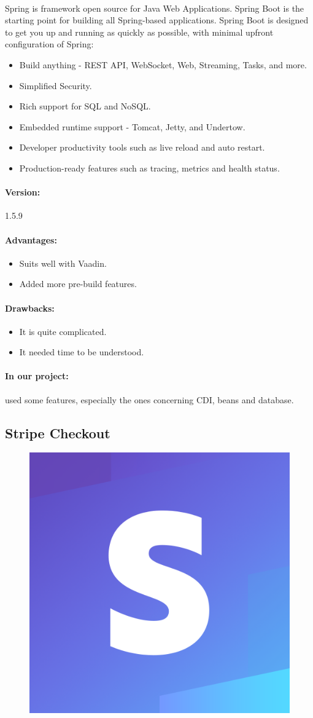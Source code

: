 \documentclass{article}
\begin{document}
		\paragraph{}Spring is framework open source for Java Web Applications. Spring Boot is the starting point for building all Spring-based applications. Spring Boot is designed to get you up and running as quickly as possible, with minimal upfront configuration of Spring: 
		\begin{itemize}
			\item{}Build anything - REST API, WebSocket, Web, Streaming, Tasks, and more.
			\item{}Simplified Security.
			\item{}Rich support for SQL and NoSQL.
			\item{}Embedded runtime support - Tomcat, Jetty, and Undertow.
			\item{}Developer productivity tools such as live reload and auto restart.
			\item{}Production-ready features such as tracing, metrics and health status.
		\end{itemize}
		\paragraph{Version:}1.5.9
		\paragraph{Advantages:}
		\begin{itemize}
			\item{}Suits well with Vaadin.
			\item{}Added more pre-build features.
		\end{itemize}
		\paragraph{Drawbacks:}
		\begin{itemize}
			\item{}It is quite complicated.
			\item{}It needed time to be understood.
		\end{itemize}
		\paragraph{In our project:}used some features, especially the ones concerning CDI, beans and database.
	\subsection{Stripe Checkout}
			\begin{figure}[H]
			\begin{center}
			\includegraphics[width=.2\linewidth]{Images/Appendix/stripe.png}
			\label{fig:Stripe}
			\end{center}
			\end{figure}		
\end{document}

